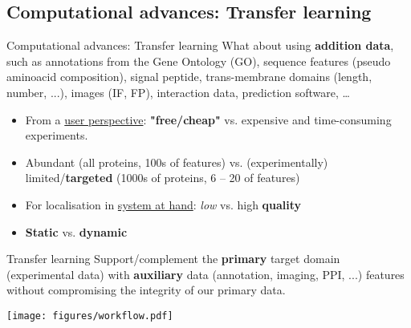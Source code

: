 
\subsection{Computational advances: Transfer learning}

\begin{frame}{Computational advances: Transfer learning}
  What about using \textbf{addition data}, such as annotations from
  the Gene Ontology (GO), sequence features (pseudo aminoacid
  composition), signal peptide, trans-membrane domains (length,
  number, ...), images (IF, FP), interaction data, prediction
  software, \ldots

  \begin{block}{}
    \begin{itemize}
    \item From a \underline{user perspective}: \textbf{"free/cheap"}
      vs. expensive and time-consuming experiments.
    \item Abundant (all proteins, 100s of features) vs. (experimentally)
      limited/\textbf{targeted} (1000s of proteins, 6 -- 20 of features)
    \item For localisation in \underline{system at hand}: \textit{low}
      vs. high \textbf{quality}
    \item \textbf{Static} vs. \textbf{dynamic}
    \end{itemize}
  \end{block}

\end{frame}

\begin{frame}{}

  \begin{block}{Transfer learning}
    Support/complement the \textbf{primary} target domain
    (experimental data) with \textbf{auxiliary} data (annotation,
    imaging, PPI, ...)  features without compromising the integrity of
    our primary data.
  \end{block}

\end{frame}


\begin{frame}
  \begin{center}
    \texttt{[image: figures/workflow.pdf]}
  \end{center}
\end{frame}


